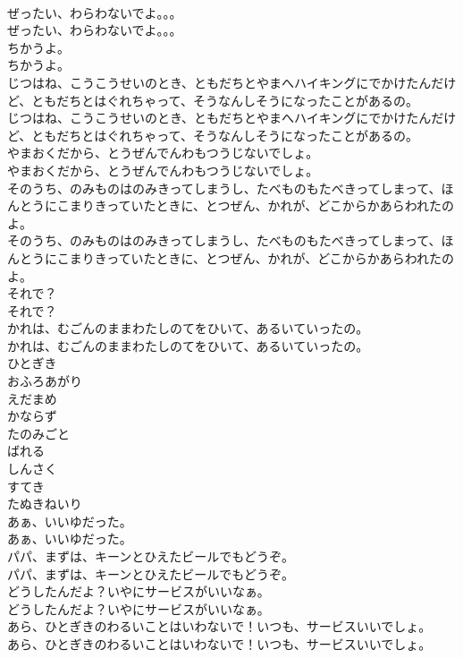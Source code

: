 \documentclass[8pt]{extreport}
\begin{document}
\begin{CJK}{UTF8}{min}
\\	ぜったい、わらわないでよ。。。
\\	ぜったい、わらわないでよ。。。
\\	ちかうよ。
\\	ちかうよ。
\\	じつはね、こうこうせいのとき、ともだちとやまへハイキングにでかけたんだけど、ともだちとはぐれちゃって、そうなんしそうになったことがあるの。
\\	じつはね、こうこうせいのとき、ともだちとやまへハイキングにでかけたんだけど、ともだちとはぐれちゃって、そうなんしそうになったことがあるの。
\\	やまおくだから、とうぜんでんわもつうじないでしょ。
\\	やまおくだから、とうぜんでんわもつうじないでしょ。
\\	そのうち、のみものはのみきってしまうし、たべものもたべきってしまって、ほんとうにこまりきっていたときに、とつぜん、かれが、どこからかあらわれたのよ。
\\	そのうち、のみものはのみきってしまうし、たべものもたべきってしまって、ほんとうにこまりきっていたときに、とつぜん、かれが、どこからかあらわれたのよ。
\\	それで？
\\	それで？
\\	かれは、むごんのままわたしのてをひいて、あるいていったの。
\\	かれは、むごんのままわたしのてをひいて、あるいていったの。
\\	ひとぎき
\\	おふろあがり
\\	えだまめ
\\	かならず
\\	たのみごと
\\	ばれる
\\	しんさく
\\	すてき
\\	たぬきねいり
\\	あぁ、いいゆだった。
\\	あぁ、いいゆだった。
\\	パパ、まずは、キーンとひえたビールでもどうぞ。
\\	パパ、まずは、キーンとひえたビールでもどうぞ。
\\	どうしたんだよ？いやにサービスがいいなぁ。
\\	どうしたんだよ？いやにサービスがいいなぁ。
\\	あら、ひとぎきのわるいことはいわないで！いつも、サービスいいでしょ。
\\	あら、ひとぎきのわるいことはいわないで！いつも、サービスいいでしょ。

\end{CJK}
\end{document}
